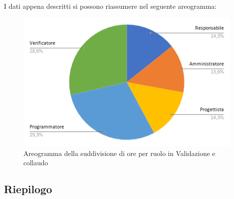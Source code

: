 I dati appena descritti si possono riassumere nel seguente areogramma:
\begin{figure}[!h]
    \vspace{5px}
    \includegraphics[scale=0.5]{../../../Images/Diagrammi/Diagramma a torta/ore validificazione.png}
    \centering
    \caption{Areogramma della suddivisione di ore per ruolo in Validazione e collaudo}
\end{figure}


\subsection{Riepilogo}
